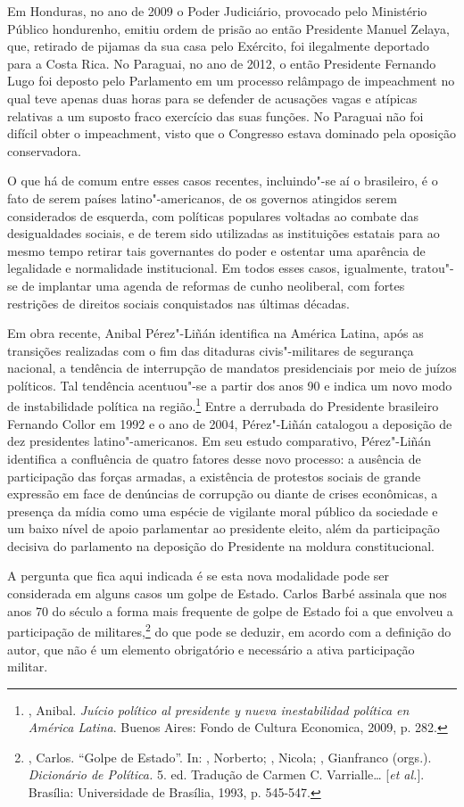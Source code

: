 Em Honduras, no ano de 2009 o Poder Judiciário, provocado pelo
Ministério Público hondurenho, emitiu ordem de prisão ao então
Presidente Manuel Zelaya, que, retirado de pijamas da sua casa pelo
Exército, foi ilegalmente deportado para a Costa Rica. No Paraguai, no
ano de 2012, o então Presidente Fernando Lugo foi deposto pelo Parlamento
em um processo relâmpago de impeachment no qual teve apenas duas horas
para se defender de acusações vagas e atípicas relativas a um suposto
fraco exercício das suas funções. No Paraguai não foi difícil obter o
impeachment, visto que o Congresso estava dominado pela oposição
conservadora.

O que há de comum entre esses casos recentes, incluindo"-se aí o
brasileiro, é o fato de serem países latino"-americanos, de os governos
atingidos serem considerados de esquerda, com políticas populares
voltadas ao combate das desigualdades sociais, e de terem sido
utilizadas as instituições estatais para ao mesmo tempo retirar tais
governantes do poder e ostentar uma aparência de legalidade e
normalidade institucional. Em todos esses casos, igualmente, tratou"-se
de implantar uma agenda de reformas de cunho neoliberal, com fortes
restrições de direitos sociais conquistados nas últimas décadas.

Em obra recente, Anibal Pérez"-Liñán identifica na América Latina, após
as transições realizadas com o fim das ditaduras civis"-militares de
segurança nacional, a tendência de interrupção de mandatos presidenciais
por meio de juízos políticos. Tal tendência acentuou"-se a partir dos
anos 90 e indica um novo modo de instabilidade política na
região.\footnote{, Anibal. \emph{Juício político al
  presidente y nueva inestabilidad política en América Latina}. Buenos
  Aires: Fondo de Cultura Economica, 2009, p. 282.} Entre a derrubada do
Presidente brasileiro Fernando Collor em 1992 e o ano de 2004,
Pérez"-Liñán catalogou a deposição de dez presidentes latino"-americanos.
Em seu estudo comparativo, Pérez"-Liñán identifica a confluência de
quatro fatores desse novo processo: a ausência de participação das
forças armadas, a existência de protestos sociais de grande expressão em
face de denúncias de corrupção ou diante de crises econômicas, a
presença da mídia como uma espécie de vigilante moral público da
sociedade e um baixo nível de apoio parlamentar ao presidente eleito,
além da participação decisiva do parlamento na deposição do Presidente
na moldura constitucional.

A pergunta que fica aqui indicada é se esta nova modalidade pode ser
considerada em alguns casos um golpe de Estado. Carlos Barbé assinala
que nos anos 70 do século  a forma mais frequente de golpe de Estado
foi a que envolveu a participação de militares,\footnote{, Carlos.
  ``Golpe de Estado''. In: , Norberto; , Nicola; ,
  Gianfranco (orgs.). \emph{Dicionário de Política.} 5. ed. Tradução de
  Carmen C. Varrialle\ldots{} [\emph{et al.}]. Brasília: Universidade de
  Brasília, 1993, p. 545-547.} do que pode se deduzir, em acordo com a
definição do autor, que não é um elemento obrigatório e necessário a
ativa participação militar.


